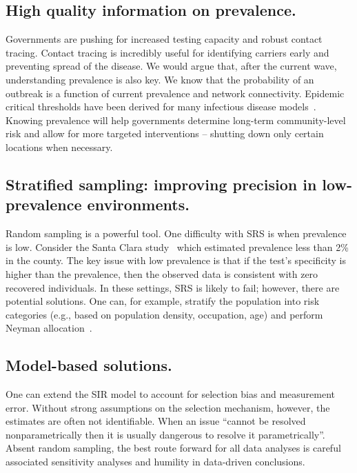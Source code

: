 \documentclass[11pt]{amsart}
\begin{document}
\subsection*{High quality information on prevalence.}

Governments are pushing for increased testing capacity and robust contact tracing.  Contact tracing is incredibly useful for identifying carriers early and preventing spread of the disease.  We would argue that, after the current wave, understanding prevalence is also key.  We know that the probability of an outbreak is a function of current prevalence and network connectivity.  Epidemic critical thresholds have been derived for many infectious disease models~\citep{Pastor2001,Newman2002,Parshani2010}.  Knowing prevalence will help governments determine long-term community-level risk and allow for more targeted interventions -- shutting down only certain locations when necessary.

\subsection*{Stratified sampling: improving precision in low-prevalence environments.}
Random sampling is a powerful tool.  One difficulty with SRS is when prevalence is low.  Consider the Santa Clara study~\citep{Bendavid2020} which estimated prevalence less than 2\% in the county.  The key issue with low prevalence is that if the test's specificity is higher than the prevalence, then the observed data is consistent with zero recovered individuals. In these settings, SRS is likely to fail; however, there are potential solutions.  One can, for example, stratify the population into risk categories (e.g., based on population density, occupation, age) and perform Neyman allocation~\citep{Cochran77}.

\subsection*{Model-based solutions.}

One can extend the SIR model to account for selection bias and measurement error. Without strong assumptions on the selection mechanism, however, the estimates are often not identifiable.  When an issue ``cannot be resolved nonparametrically then it is usually dangerous to resolve it parametrically''\citep{CoxHink74}. Absent random sampling, the best route forward for all data analyses is careful associated sensitivity analyses and humility in data-driven conclusions.
\end{document}
